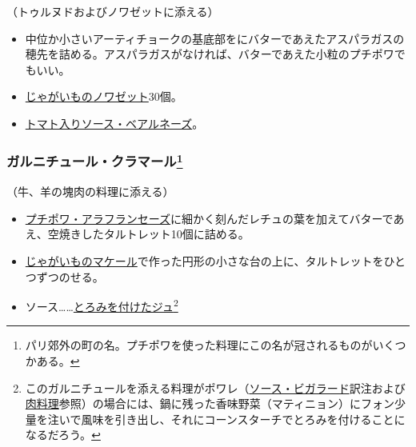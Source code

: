 \begin{recette}


（トゥルヌドおよびノワゼットに添える）

\begin{itemize}
\item
  中位か小さいアーティチョークの基底部をにバターであえたアスパラガスの穂先を詰める。アスパラガスがなければ、バターであえた小粒のプチポワでもいい。
\item
  \protect\hyperlink{pommes-de-terre-noisette}{じゃがいものノワゼット}30個。
\item
  \protect\hyperlink{sauce-bearnaise-tomatee}{トマト入りソース・ベアルネーズ}。
\end{itemize}

\hypertarget{garniture-clamart}{%
\subsubsection[ガルニチュール・クラマール]{\texorpdfstring{ガルニチュール・クラマール\footnote{パリ郊外の町の名。プチポワを使った料理にこの名が冠されるものがいくつかある。}}{ガルニチュール・クラマール}}\label{garniture-clamart}}



（牛、羊の塊肉の料理に添える）

\begin{itemize}
\item
  \protect\hyperlink{petits-pois-francaise}{プチポワ・アラフランセーズ}に細かく刻んだレチュの葉を加えてバターであえ、空焼きしたタルトレット10個に詰める。
\item
  \protect\hyperlink{pommes-de-terre-macaire}{じゃがいものマケール}で作った円形の小さな台の上に、タルトレットをひとつずつのせる。
\item
  ソース\ldots{}\ldots{}\protect\hyperlink{jus-de-veau-lie}{とろみを付けたジュ}\footnote{このガルニチュールを添える料理がポワレ（\protect\hyperlink{sauce-bigarade}{ソース・ビガラード}訳注および\protect\hyperlink{releves-et-entrees}{肉料理}参照）の場合には、鍋に残った香味野菜（マティニョン）にフォン少量を注いで風味を引き出し、それにコーンスターチでとろみを付けることになるだろう。}
\end{itemize}


\end{recette}
